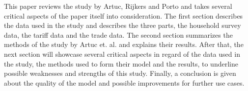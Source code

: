 This paper reviews the study by Artuc, Rijkers and Porto and takes several critical aspects of the paper itself into consideration.
The first section describes the data used in the study and describes the three parts, the household survey data, the tariff data
and the trade data. The second section summarizes the methods of the study by Artuc et. al. and explains their results.
After that, the next section will showcase several critical aspects in regard of the data used in the study, 
the methods used to form their model and the results, to underline possible weaknesses and strengths of this study. 
Finally, a conclusion is given about the quality of the model and possible improvements for further use cases. 